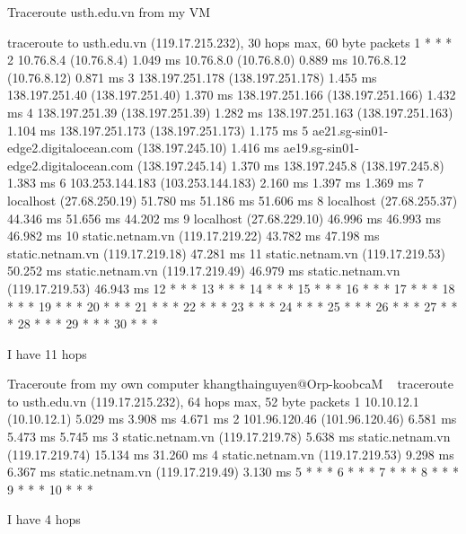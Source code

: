 Traceroute usth.edu.vn from my VM

traceroute to usth.edu.vn (119.17.215.232), 30 hops max, 60 byte packets
 1  * * *
 2  10.76.8.4 (10.76.8.4)  1.049 ms 10.76.8.0 (10.76.8.0)  0.889 ms 10.76.8.12 (10.76.8.12)  0.871 ms
 3  138.197.251.178 (138.197.251.178)  1.455 ms 138.197.251.40 (138.197.251.40)  1.370 ms 138.197.251.166 (138.197.251.166)  1.432 ms
 4  138.197.251.39 (138.197.251.39)  1.282 ms 138.197.251.163 (138.197.251.163)  1.104 ms 138.197.251.173 (138.197.251.173)  1.175 ms
 5  ae21.sg-sin01-edge2.digitalocean.com (138.197.245.10)  1.416 ms ae19.sg-sin01-edge2.digitalocean.com (138.197.245.14)  1.370 ms 138.197.245.8 (138.197.245.8)  1.383 ms
 6  103.253.144.183 (103.253.144.183)  2.160 ms  1.397 ms  1.369 ms
 7  localhost (27.68.250.19)  51.780 ms  51.186 ms  51.606 ms
 8  localhost (27.68.255.37)  44.346 ms  51.656 ms  44.202 ms
 9  localhost (27.68.229.10)  46.996 ms  46.993 ms  46.982 ms
10  static.netnam.vn (119.17.219.22)  43.782 ms  47.198 ms static.netnam.vn (119.17.219.18)  47.281 ms
11  static.netnam.vn (119.17.219.53)  50.252 ms static.netnam.vn (119.17.219.49)  46.979 ms static.netnam.vn (119.17.219.53)  46.943 ms
12  * * *
13  * * *
14  * * *
15  * * *
16  * * *
17  * * *
18  * * *
19  * * *
20  * * *
21  * * *
22  * * *
23  * * *
24  * * *
25  * * *
26  * * *
27  * * *
28  * * *
29  * * *
30  * * *

I have 11 hops

Traceroute from my own computer
khangthainguyen@Orp-koobcaM ~ %
traceroute to usth.edu.vn (119.17.215.232), 64 hops max, 52 byte packets
 1  10.10.12.1 (10.10.12.1)  5.029 ms  3.908 ms  4.671 ms
 2  101.96.120.46 (101.96.120.46)  6.581 ms  5.473 ms  5.745 ms
 3  static.netnam.vn (119.17.219.78)  5.638 ms
    static.netnam.vn (119.17.219.74)  15.134 ms  31.260 ms
 4  static.netnam.vn (119.17.219.53)  9.298 ms  6.367 ms
    static.netnam.vn (119.17.219.49)  3.130 ms
 5  * * *
 6  * * *
 7  * * *
 8  * * *
 9  * * *
10  * * *

I have 4 hops